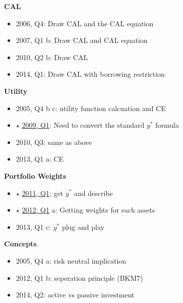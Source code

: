 \documentclass[]{book}
\providecommand{\tightlist}{%
  \setlength{\itemsep}{0pt}\setlength{\parskip}{0pt}}
\theoremstyle{definition}
\theoremstyle{definition}
\theoremstyle{remark}
\begin{document}
\textbf{CAL}

\begin{itemize}
\tightlist
\item
  2006, Q4: Draw CAL and the CAL equation
\item
  2007, Q1 b: Draw CAL and CAL equation
\item
  2010, Q2 b: Draw CAL
\item
  2014, Q1: Draw CAL with borrowing restriction
\end{itemize}

\textbf{Utility}

\begin{itemize}
\tightlist
\item
  2005, Q4 b c: utility function calcuation and CE
\item
  \(\star\) \protect\hyperlink{2009-1}{2009, Q1}: Need to convert the
  standard \(y^*\) formula
\item
  2010, Q3: same as above
\item
  2013, Q1 a: CE
\end{itemize}

\textbf{Portfolio Weights}

\begin{itemize}
\tightlist
\item
  \(\star\) \protect\hyperlink{2011-1}{2011, Q1}: get \(y^*\) and
  describe
\item
  \(\star\) \protect\hyperlink{2012-1}{2012, Q1} a: Getting weights for
  each assets
\item
  2013, Q1 c: \(y^*\) plug and play
\end{itemize}

\textbf{Concepts}

\begin{itemize}
\tightlist
\item
  2005, Q4 a: risk neutral implication
\item
  2012, Q1 b: seperation principle (BKM7)
\item
  2014, Q2: active vs passive investment
\end{itemize}
\end{document}
